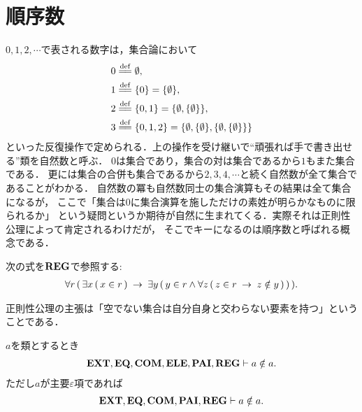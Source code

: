 \section{順序数}
	$0,1,2,\cdots$で表される数字は，集合論において
	\begin{align}
		0 &\defeq \emptyset, \\
		1 &\defeq \{0\} = \{\emptyset\}, \\
		2 &\defeq \{0,1\} = \{\emptyset,\{\emptyset\}\}, \\
		3 &\defeq \{0,1,2\} = \{\emptyset,\{\emptyset\},\{\emptyset,\{\emptyset\}\}\}
	\end{align}
	といった反復操作で定められる．上の操作を受け継いで``頑張れば手で書き出せる''類を自然数と呼ぶ．
	$0$は集合であり，集合の対は集合であるから$1$もまた集合である．
	更には集合の合併も集合であるから$2,3,4,\cdots$と続く自然数が全て集合であることがわかる．
	自然数の冪も自然数同士の集合演算もその結果は全て集合になるが，
	ここで「集合は$0$に集合演算を施しただけの素姓が明らかなものに限られるか」
	という疑問というか期待が自然に生まれてくる．実際それは正則性公理によって肯定されるわけだが，
	そこでキーになるのは順序数と呼ばれる概念である．
	
	\begin{screen}
		\begin{axm}[正則性公理]
			次の式を$\mbox{{\bf REG}}$で参照する:
			\begin{align}
				\forall r\, (\, \exists x\, (\, x \in r\, )
				\hspace{0.25em}\rightarrow\hspace{0.25em} \exists y\, (\, y \in r \wedge \forall z\, 
				(\, z \in r \hspace{0.25em}\rightarrow\hspace{0.25em} z \notin y\, )\, )\, ).
			\end{align}
		\end{axm}
	\end{screen}
	
	正則性公理の主張は「空でない集合は自分自身と交わらない要素を持つ」ということである．
	
	\begin{screen}
		\begin{thm}[類は自分自身を要素に持たない]
		\label{thm:no_class_contains_itself}
			$a$を類とするとき
			\begin{align}
				\mbox{{\bf EXT}},\mbox{{\bf EQ}},\mbox{\bf COM},\mbox{{\bf ELE}},\mbox{{\bf PAI}},\mbox{{\bf REG}} \vdash a \notin a.
			\end{align}
			ただし$a$が主要$\varepsilon$項であれば
			\begin{align}
				\mbox{{\bf EXT}},\mbox{{\bf EQ}},\mbox{\bf COM},\mbox{{\bf PAI}},\mbox{{\bf REG}} \vdash a \notin a.
			\end{align}
		\end{thm}
	\end{screen}
	
